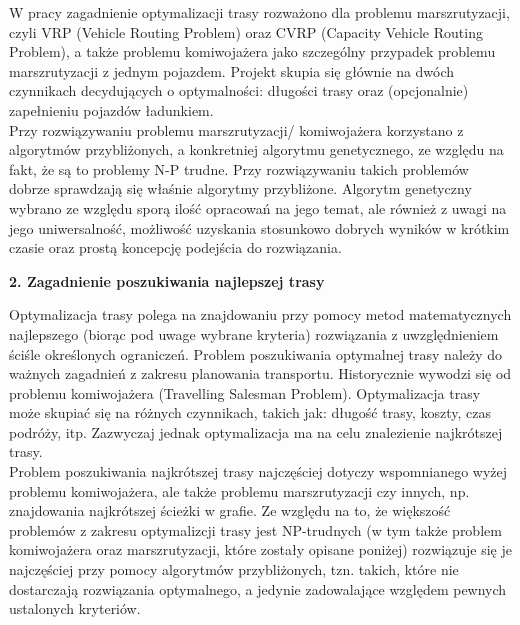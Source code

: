 \documentclass[a4paper, twoside, 12pt, justified]{article}
\begin{document}
	W pracy zagadnienie optymalizacji trasy rozważono dla problemu marszrutyzacji, czyli VRP (Vehicle Routing Problem) oraz CVRP (Capacity Vehicle Routing Problem), a także problemu komiwojażera jako szczególny przypadek problemu marszrutyzacji z jednym pojazdem. Projekt skupia się głównie na dwóch czynnikach decydujących o optymalności: długości trasy oraz (opcjonalnie) zapełnieniu pojazdów ładunkiem. \\
	Przy rozwiązywaniu problemu marszrutyzacji/ komiwojażera korzystano z algorytmów przybliżonych, a konkretniej algorytmu genetycznego, ze względu na fakt, że są to problemy N-P trudne. Przy rozwiązywaniu takich problemów dobrze sprawdzają się właśnie algorytmy przybliżone. Algorytm genetyczny wybrano ze względu sporą ilość opracowań na jego temat, ale również z uwagi na jego uniwersalność, możliwość uzyskania stosunkowo dobrych wyników w krótkim czasie oraz prostą koncepcję podejścia do rozwiązania. \\
	
	
	
	\newpage
	\begin{flushleft}
		\begin{LARGE}
			\textbf{2. Zagadnienie poszukiwania najlepszej trasy}
		\end{LARGE}
	\end{flushleft}

	\vspace{5mm} %
	
	Optymalizacja trasy polega na znajdowaniu przy pomocy metod matematycznych najlepszego (biorąc pod uwage wybrane kryteria) rozwiązania z uwzględnieniem ściśle określonych ograniczeń. Problem poszukiwania optymalnej trasy należy do ważnych zagadnień z zakresu planowania transportu. Historycznie wywodzi się od problemu komiwojażera (Travelling Salesman Problem). Optymalizacja trasy może skupiać się na różnych czynnikach, takich jak: długość trasy, koszty, czas podróży, itp. Zazwyczaj jednak optymalizacja ma na celu znalezienie najkrótszej trasy.\\
	Problem poszukiwania najkrótszej trasy najczęściej dotyczy wspomnianego wyżej problemu komiwojażera, ale także problemu marszrutyzacji czy innych, np. znajdowania najkrótszej ścieżki w grafie. Ze względu na to, że większość problemów z zakresu optymalizcji trasy jest NP-trudnych (w tym także problem komiwojażera oraz marszrutyzacji, które zostały opisane poniżej) rozwiązuje się je najczęściej przy pomocy algorytmów przybliżonych, tzn. takich, które nie dostarczają rozwiązania optymalnego, a jedynie zadowalające względem pewnych ustalonych kryteriów. 
	
\end{document}
